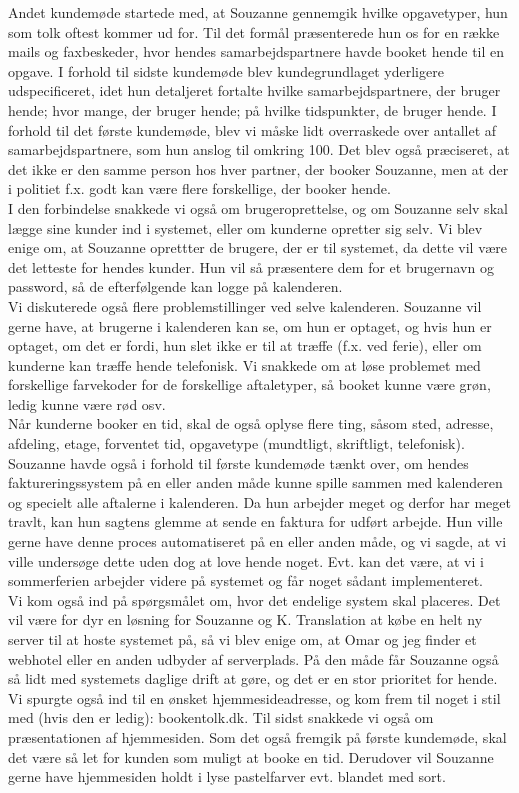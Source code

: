 \documentclass[12pt]{article}   %
\begin{document}
Andet kundemøde startede med, at Souzanne gennemgik hvilke opgavetyper, hun som tolk oftest kommer ud for. Til det formål præsenterede hun os for en række mails og faxbeskeder, hvor hendes samarbejdspartnere havde booket hende til en opgave. I forhold til sidste kundemøde blev kundegrundlaget yderligere udspecificeret, idet hun detaljeret fortalte hvilke samarbejdspartnere, der bruger hende; hvor mange, der bruger hende; på hvilke tidspunkter, de bruger hende. I forhold til det første kundemøde, blev vi måske lidt overraskede over antallet af samarbejdspartnere, som hun anslog til omkring 100. Det blev også præciseret, at det ikke er den samme person hos hver partner, der booker Souzanne, men at der i politiet f.x. godt kan være flere forskellige, der booker hende. \\
I den forbindelse snakkede vi også om brugeroprettelse, og om Souzanne selv skal lægge sine kunder ind i systemet, eller om kunderne opretter sig selv. Vi blev enige om, at Souzanne oprettter de brugere, der er til systemet, da dette vil være det letteste for hendes kunder. Hun vil så præsentere dem for et brugernavn og password, så de efterfølgende kan logge på kalenderen. \\
Vi diskuterede også flere problemstillinger ved selve kalenderen. Souzanne vil gerne have, at brugerne i kalenderen kan se, om hun er optaget, og hvis hun er optaget, om det er fordi, hun slet ikke er til at træffe (f.x. ved ferie), eller om kunderne kan træffe hende telefonisk. Vi snakkede om at løse problemet med forskellige farvekoder for de forskellige aftaletyper, så booket kunne være grøn, ledig kunne være rød osv. \\
Når kunderne booker en tid, skal de også oplyse flere ting, såsom sted, adresse, afdeling, etage, forventet tid, opgavetype (mundtligt, skriftligt, telefonisk). 
Souzanne havde også i forhold til første kundemøde tænkt over, om hendes faktureringssystem på en eller anden måde kunne spille sammen med kalenderen og specielt alle aftalerne i kalenderen. Da hun arbejder meget og derfor har meget travlt, kan hun sagtens glemme at sende en faktura for udført arbejde. Hun ville gerne have denne proces automatiseret på en eller anden måde, og vi sagde, at vi ville undersøge dette uden dog at love hende noget. Evt. kan det være, at vi i sommerferien arbejder videre på systemet og får noget sådant implementeret. \\
Vi kom også ind på spørgsmålet om, hvor det endelige system skal placeres. Det vil være for dyr en løsning for Souzanne og K. Translation at købe en helt ny server til at hoste systemet på, så vi blev enige om, at Omar og jeg finder et webhotel eller en anden udbyder af serverplads. På den måde får Souzanne også så lidt med systemets daglige drift at gøre, og det er en stor prioritet for hende. Vi spurgte også ind til en ønsket hjemmesideadresse, og kom frem til noget i stil med (hvis den er ledig): bookentolk.dk.  
Til sidst snakkede vi også om præsentationen af hjemmesiden. Som det også fremgik på første kundemøde, skal det være så let for kunden som muligt at booke en tid. Derudover vil Souzanne gerne have hjemmesiden holdt i lyse pastelfarver evt. blandet med sort.
\end{document}
